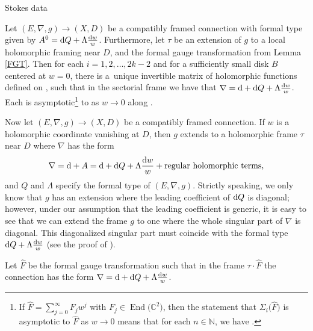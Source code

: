 \begin{subsubsection}{Stokes data}
\begin{Theorem}[{\cite[Theorem 3.1]{B}}] Let $(E,\nabla,g)\to (X,D)$ be a compatibly framed connection with formal type given by $A^0={\rm d}Q+\Lambda \frac{{\rm d}w}{w}$. Furthermore, let $\tau$ be an extension of $g$ to a local holomorphic framing near $D$, and  the formal gauge transformation from Lemma {\rm\ref{FGT}}. Then for each $i=1,2,\dots ,2k-2$ and for a sufficiently small disk $B$ centered at $w=0$, there is a~unique invertible matrix  of holomorphic functions defined on , such that in the sectorial frame  we have that
$
 \nabla={\rm d} + {\rm d}Q +\Lambda \frac{{\rm d}w}{w}$.
Each  is asymptotic\footnote{If $\widehat{F}=\sum_{j=0}^{\infty}F_jw^j$ with $F_j\in \operatorname{End}\bigl(\mathbb{C}^2\bigr)$, then the statement that $\Sigma_i\bigl(\widehat{F}\bigr)$ is asymptotic to $\widehat{F}$ as $w\to 0$ means that for each $n\in \mathbb{N}$, we have .} to  as $w \to 0$ along .

\end{Theorem}


Now let $(E,\nabla,g)\to (X,D)$ be a compatibly framed connection. If $w$ is a holomorphic coordinate vanishing at $D$, then $g$ extends to a holomorphic frame $\tau$ near $D$ where $\nabla$ has the form
\begin{equation*}
 \nabla={\rm d}+A={\rm d}+ {\rm d}Q+\Lambda \frac{{\rm d}w}{w}+ \text{regular holomorphic terms},
\end{equation*}
and $Q$ and $\Lambda$ specify the formal type of $(E,\nabla,g)$. Strictly speaking, we only know that $g$ has an extension where the leading coefficient of ${\rm d}Q$ is diagonal; however, under our assumption that the leading coefficient is generic, it is easy to see that we can extend the frame $g$ to one where the whole singular part of $\nabla$ is diagonal. This diagonalized singular part must coincide with the formal type ${\rm d}Q+\Lambda \frac{{\rm d}w}{w}$ (see the proof of \cite[Lemma 1]{B2}).

Let $\widehat{F}$ be the formal gauge transformation such that in the frame $\tau \cdot \widehat{F}$ the connection has the form
$\nabla={\rm d}+{\rm d}Q+\Lambda \frac{{\rm d}w}{w}$.


\end{subsubsection}
